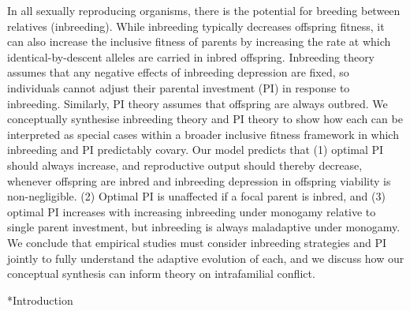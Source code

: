 \documentclass[12pt]{article}
\makeatletter
\renewcommand\section{\@startsection{section}{1}{0in}{-0.5\baselineskip}{0.1\baselineskip}{\normalfont\large\bfseries}}
\makeatother
\begin{document}
In all sexually reproducing organisms, there is the potential for breeding between relatives (inbreeding). While inbreeding typically decreases offspring fitness, it can also increase the inclusive fitness of parents by increasing the rate at which identical-by-descent alleles are carried in inbred offspring. Inbreeding theory assumes that any negative effects of inbreeding depression are fixed, so individuals cannot adjust their parental investment (PI) in response to inbreeding. Similarly, PI theory assumes that offspring are always outbred. We conceptually synthesise inbreeding theory and PI theory to show how each can be interpreted as special cases within a broader inclusive fitness framework in which inbreeding and PI predictably covary. Our model predicts that (1) optimal PI should always increase, and reproductive output should thereby decrease, whenever offspring are inbred and inbreeding depression in offspring viability is non-negligible. (2) Optimal PI is unaffected if a focal parent is inbred, and (3) optimal PI increases with increasing inbreeding under monogamy relative to single parent investment, but inbreeding is always maladaptive under monogamy. We conclude that empirical studies must consider inbreeding strategies and PI jointly to fully understand the adaptive evolution of each, and we discuss how our conceptual synthesis can inform theory on intrafamilial conflict.


\section*{Introduction}


\end{document}
